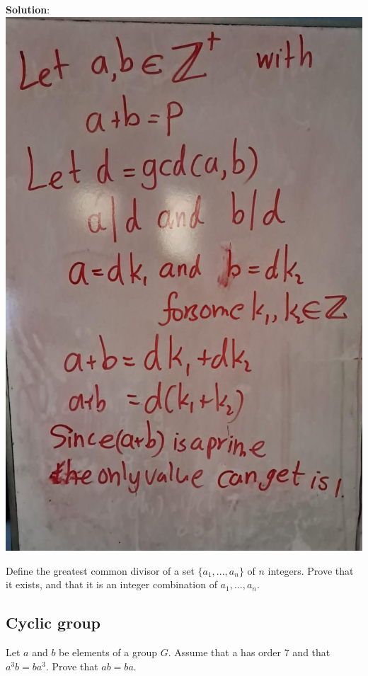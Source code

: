 \documentclass[
]{book}
\begin{document}
\textbf{Solution}: \includegraphics{figures/ch_2/fig21.jpg}

\leavevmode{}%
Define the greatest common divisor of a set \(\{a_1, ..., a_n\}\) of
\(n\) integers. Prove that it exists, and that it is an integer
combination of \(a_1, ..., a_n\).

\hypertarget{cyclic-group}{%
\subsection{Cyclic group}\label{cyclic-group}}

\leavevmode{}%
Let \(a\) and \(b\) be elements of a group \(G\). Assume that a has
order \(7\) and that \(a^3b = ba^3\). Prove that \(a b = ba\).
\end{document}
